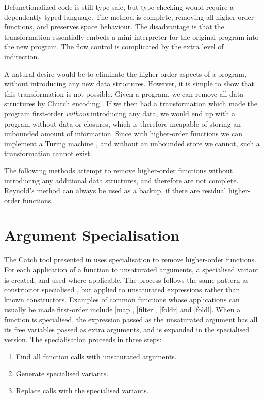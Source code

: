 Defunctionalized code is still type safe, but type checking would require a dependently typed language. The method is complete, removing all higher-order functions, and preserves space behaviour. The disadvantage is that the transformation essentially embeds a mini-interpreter for the original program into the new program. The flow control is complicated by the extra level of indirection.

A natural desire would be to eliminate the higher-order aspects of a program, without introducing any new data structures. However, it is simple to show that this transformation is not possible. Given a program, we can remove all data structures by Church encoding \cite{church_encode}. If we then had a transformation which made the program first-order \textit{without} introducing any data, we would end up with a program without data or closures, which is therefore incapable of storing an unbounded amount of information. Since with higher-order functions we can implement a Turing machine \cite{turing:halting}, and without an unbounded store we cannot, such a transformation cannot exist.

The following methods attempt to remove higher-order functions without introducing any additional data structures, and therefore are not complete. Reynold's method can always be used as a backup, if there are residual higher-order functions.


\section{Argument Specialisation}

The Catch tool presented in \cite{me:catch_tfp} uses specialisation to remove higher-order functions. For each application of a function to unsaturated arguments, a specialised variant is created, and used where applicable. The process follows the same pattern as constructor specialised \cite{spj:specconstr}, but applied to unsaturated expressions rather than known constructors. Examples of common functions whose applications can usually be made first-order include |map|, |filter|, |foldr| and |foldl|. When a function is specialised, the expression passed as the unsaturated argument has all its free variables passed as extra arguments, and is expanded in the specialised version. The specialisation proceeds in three steps:

\begin{enumerate}
\item Find all function calls with unsaturated arguments.
\item Generate specialised variants.
\item Replace calls with the specialised variants.
\end{enumerate}

